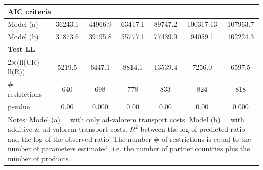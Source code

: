\documentclass[11pt,twoside, authoryear]{elsarticle}
\begin{document}
\begin{table}[htbp]
\begin{center}
{\begin{tabular}{l|cccccc}
\multicolumn{7}{l}{\textbf{AIC criteria} }  \\ \hline
Model (a)& \multicolumn{1}{c}{36243.1} & \multicolumn{1}{c}{44966.9} & \multicolumn{1}{c}{63417.1} & \multicolumn{1}{c}{89747.2} & \multicolumn{1}{c}{100317.13} & \multicolumn{1}{c}{107963.7} \\
Model (b) & \multicolumn{1}{c}{31873.6} & \multicolumn{1}{c}{39495.8} & \multicolumn{1}{c}{55777.1} & \multicolumn{1}{c}{77439.9} & \multicolumn{1}{c}{94059.1} & \multicolumn{1}{c}{102224.3}  \\ \hline
\multicolumn{7}{l}{\textbf{Test LL} }    \\ \hline
2$\times$(ll(UR) -ll(R)) & \multicolumn{1}{c}{5219.5} & \multicolumn{1}{c}{6447.1} & \multicolumn{1}{c}{8814.1} & \multicolumn{1}{c}{13539.4} & \multicolumn{1}{c}{7256.0} & \multicolumn{1}{c}{6597.5}  \\
\# restrictions  & \multicolumn{1}{c}{640} & \multicolumn{1}{c}{698} & \multicolumn{1}{c}{778} & \multicolumn{1}{c}{833} & \multicolumn{1}{c}{824} & \multicolumn{1}{c}{818}  \\
p-value & \multicolumn{1}{c}{0.00} & \multicolumn{1}{c}{0.000} & \multicolumn{1}{c}{0.00} & \multicolumn{1}{c}{0.00} & \multicolumn{1}{c}{0.00} & \multicolumn{1}{c}{0.000} \\
\hline\hline
\multicolumn{7}{l}{\parbox[l]{13cm}{ \vspace{7pt}\scriptsize{Notes: Model (a) = with only ad-valorem transport costs.
Model (b) = with additive \& ad-valorem
transport costs.
$R^{2}$ between the log of predicted ratio and the log of the observed ratio.
The number \# of restrictions is equal to the number of parameters estimated, i.e. the number of partner countries plus the number of products.}}}
\end{tabular}%
}
\end{center}
\end{table}%
\end{document}
